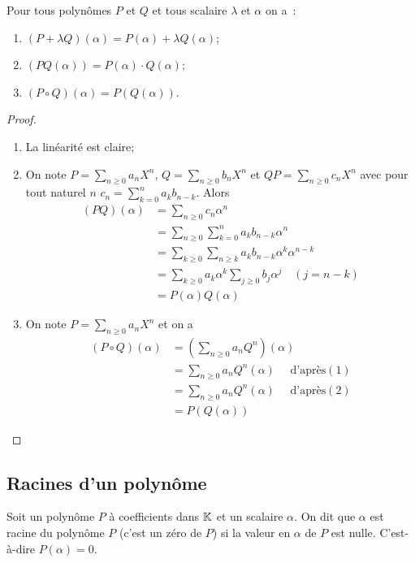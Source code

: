 \begin{prop}
  Pour tous polynômes $P$ et $Q$ et tous scalaire $\lambda$ et $\alpha$ on a~:
  \begin{enumerate}
  \item $(P+\lambda Q)(\alpha)=P(\alpha) + \lambda Q(\alpha)$;
  \item $(PQ(\alpha))=P(\alpha) \cdot Q(\alpha)$;
  \item $(P \circ Q)(\alpha) = P(Q(\alpha))$.
  \end{enumerate}
\end{prop}
\begin{proof}
  \begin{enumerate}
  \item La linéarité est claire;
  \item On note $P=\sum_{n \geqslant 0}a_n X^n$, $Q=\sum_{n \geqslant 0}b_n X^n$ et $QP=\sum_{n \geqslant 0}c_n X^n$ avec pour tout naturel $n$ $c_n = \sum_{k=0}^n a_kb_{n-k}$. Alors
    \begin{align}
      (PQ)(\alpha)&=\sum_{n \geqslant 0}c_n \alpha^n \\
      &=\sum_{n \geqslant 0} \sum_{k=0}^n a_k b_{n-k} \alpha^n\\
      &=\sum_{k \geqslant 0} \sum_{n \geqslant k} a_k b_{n-k} \alpha^k \alpha^{n-k}\\
      &=\sum_{k \geqslant 0}  a_k  \alpha^k \sum_{j \geqslant 0} b_j \alpha^j \quad (j=n-k)\\
      &=P(\alpha) Q(\alpha)
    \end{align}
  \item On note $P=\sum_{n \geqslant 0}a_n X^n$ et on a
    \begin{align}
      (P \circ Q)(\alpha) &= \left(\sum_{n \geqslant 0} a_n Q^n \right)(\alpha)\\
      &= \sum_{n \geqslant 0} a_n Q^n(\alpha) \quad \text{~d'après} (1)\\
      &= \sum_{n \geqslant 0} a_n Q^n(\alpha) \quad \text{~d'après} (2)\\
      &= P(Q(\alpha))
    \end{align}
  \end{enumerate}
\end{proof}

\subsection{Racines d'un polynôme}

\begin{defdef}
  Soit un polynôme $P$ à coefficients dans $\mathbb{K}$ et un scalaire $\alpha$. On dit que $\alpha$ est racine du polynôme  $P$ (c'est un zéro de $P$) si la valeur en $\alpha$ de $P$ est nulle. C'est-à-dire $P(\alpha)=0$.
\end{defdef}

